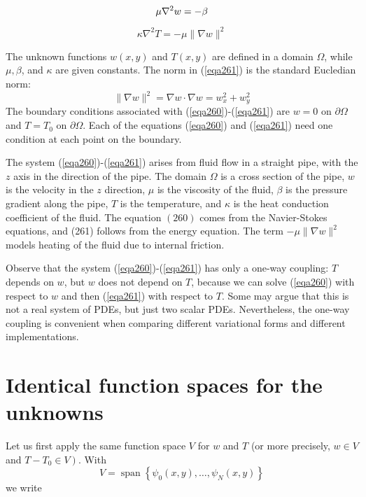 \documentclass[../main.tex]{subfiles}
\begin{document}
		\begin{equation}
			\label{eqa260}
			\mu \nabla^{2} w=-\beta \\
		\end{equation}
	
		\begin{equation}
			\label{eqa261}
			\kappa \nabla^{2} T=-\mu\|\nabla w\|^{2}
		\end{equation}
		
		\noindent The unknown functions $w(x, y)$ and $T(x, y)$ are defined in a domain $\Omega$, while $\mu, \beta$, and $\kappa$ are given constants. The norm in (\ref{eqa261}) is the standard Eucledian norm:
		$$
		\|\nabla w\|^{2}=\nabla w \cdot \nabla w=w_{x}^{2}+w_{y}^{2}
		$$
		The boundary conditions associated with (\ref{eqa260})-(\ref{eqa261}) are $w=0$ on $\partial \Omega$ and $T=T_{0}$ on $\partial \Omega$. Each of the equations (\ref{eqa260}) and (\ref{eqa261}) need one condition at each point on the boundary.
		
		The system (\ref{eqa260})-(\ref{eqa261}) arises from fluid flow in a straight pipe, with the $z$ axis in the direction of the pipe. The domain $\Omega$ is a cross section of the pipe, $w$ is the velocity in the $z$ direction, $\mu$ is the viscosity of the fluid, $\beta$ is the pressure gradient along the pipe, $T$ is the temperature, and $\kappa$ is the heat conduction coefficient of the fluid. The equation $(260)$ comes from the Navier-Stokes equations, and (261) follows from the energy equation. The term $-\mu\|\nabla w\|^{2}$ models heating of the fluid due to internal friction.
		
		Observe that the system (\ref{eqa260})-(\ref{eqa261}) has only a one-way coupling: $T$ depends on $w$, but $w$ does not depend on $T$, because we can solve (\ref{eqa260}) with respect to $w$ and then (\ref{eqa261}) with respect to $T$. Some may argue that this is not a real system of PDEs, but just two scalar PDEs. Nevertheless, the one-way coupling is convenient when comparing different variational forms and different implementations.
	\section[Identical function spaces for the unknowns]{Identical function spaces for the unknowns}
		\label{sec:sec_20_3}
		\noindent Let us first apply the same function space $V$ for $w$ and $T$ (or more precisely, $w \in V$ and $\left.T-T_{0} \in V\right)$. With
		$$
		V=\operatorname{span}\left\{\psi_{0}(x, y), \ldots, \psi_{N}(x, y)\right\}
		$$
		we write
		
\end{document}

